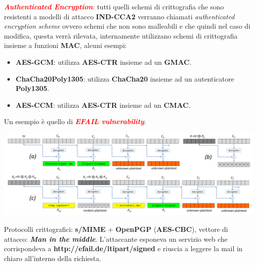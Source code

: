 \begin{flushleft}
    \textcolor{red}{\textbf{\textit{Authenticated Encryption}}}: tutti quelli schemi di crittografia che sono resistenti a modelli di attacco \textbf{IND-CCA2} verranno chiamati \textit{authenticated encryption scheme} ovvero schemi che non sono malleabili e che quindi nel caso di modifica, questa verrà rilevata, internamente utilizzano schemi di crittografia insieme a funzioni \textbf{MAC}, alcuni esempi:
    \begin{itemize}[nosep]
        \item \textbf{AES-GCM}: utilizza \textbf{AES-CTR} insieme ad un \textbf{GMAC}.
        \item \textbf{ChaCha20Poly1305}: utilizza \textbf{ChaCha20} insieme ad un autenticatore \textbf{Poly1305}.
        \item \textbf{AES-CCM}: utilizza \textbf{AES-CTR} insieme ad un \textbf{CMAC}.
    \end{itemize}
    Un esempio è quello di \textcolor{red}{\textbf{\textit{EFAIL vulnerability}}}.

    {\centering
        \includegraphics[width=\textwidth]{img/efail.png}
    \par}

    Protocolli crittografici: \textbf{s/MIME} + \textbf{OpenPGP} (\textbf{AES-CBC}), vettore di attacco: \textbf{\textit{Man in the middle}}. L'attaccante esponeva un servizio web che corrispondeva a \textbf{http://efail.de/ltipart/signed} e riuscia a leggere la mail in chiaro all'interno della richiesta.
\end{flushleft}